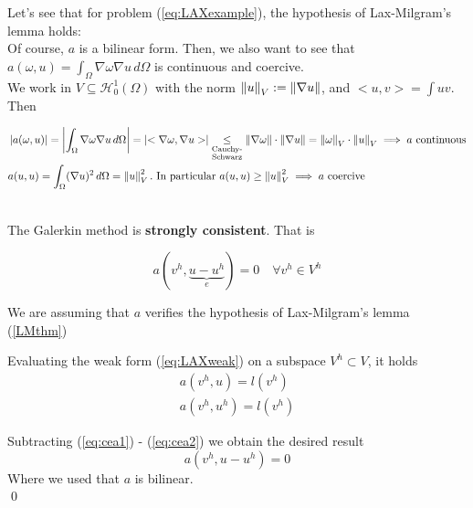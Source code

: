 \newpage

\begin{example}
  Let's see that for problem (\ref{eq:LAXexample}), the hypothesis of Lax-Milgram's lemma holds: \\
  
  Of course, $a$ is a bilinear form. Then, we also want to see that $a(\omega,u) = \int_{\Omega}\nabla \omega \nabla u \, d\Omega$ is continuous and coercive.\\
  
  We work in $V\subseteq \mathcal{H}_0^1(\Omega)$ with the norm $\left\lVert u\right\rVert_V := \left\lVert\nabla u\right\rVert$, and $<u,v> = \displaystyle{\int} uv$. Then
  
\begin{align*}
    &\left\vert a(\omega, u) \right\vert = \left\vert \int_{\Omega}\nabla \omega \nabla u \, d\Omega \right\vert = \left\vert <\nabla\omega,\nabla u> \right\vert \underset{\substack{\text{Cauchy-}\\\text{Schwarz}}}{\leq} \left\lVert\nabla\omega\right\rVert\cdot\left\lVert\nabla u\right\rVert = \left\lVert\omega\right\rVert_V\cdot\left\lVert u\right\rVert_V \implies a \text{ continuous}\\
    &a(u,u) = \int_{\Omega} (\nabla u)^2 \, d\Omega = \left\lVert u\right\rVert_V^2. \text{ In particular } a(u,u) \geq \left\lVert u\right\rVert_V^2 \implies a \text{ coercive}
\end{align*}
  
\end{example}


\begin{lemma}[Céa]\-\\
  The Galerkin method is \textbf{strongly consistent}. That is
  
  \[
    a(v^h, \underbrace{u-u^h}_e) = 0 \quad \forall v^h \in V^h
  \]
\end{lemma}

\begin{remark}
  We are assuming that $a$ verifies the hypothesis of Lax-Milgram's lemma (\ref{LMthm})
\end{remark}



\begin{demo}
  Evaluating the weak form (\ref{eq:LAXweak}) on a subspace $V^h \subset V$, it holds
  \begin{align}
      a(v^h,u) = l(v^h)\label{eq:cea1}\\ 
      a(v^h,u^h) = l(v^h) \label{eq:cea2}
  \end{align}
  
  Subtracting (\ref{eq:cea1}) - (\ref{eq:cea2}) we obtain the desired result
  \[
    a(v^h, u-u^h) = 0
  \]
  Where we used that $a$ is bilinear. \\\qed
\end{demo}

